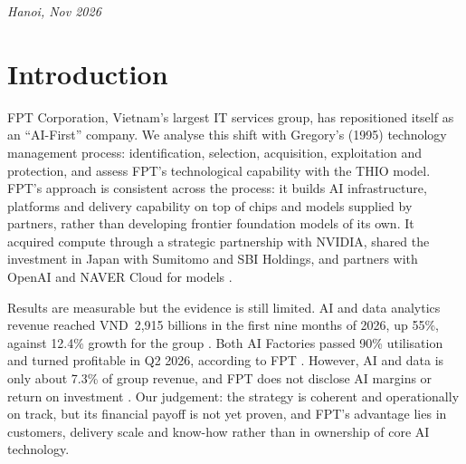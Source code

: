 \documentclass[a4paper,12pt]{report}
\begin{document}
\vfill
\begin{center}
    \textit{Hanoi, Nov 2026}
\end{center}
\newpage


\setcounter{tocdepth}{0}
\tableofcontents
\clearpage
{}
\setcounter{tocdepth}{1}
\listoftables

\clearpage
{}
\setcounter{tocdepth}{1}
\listoffigures

\providecommand{\pending}[1]{\textbf{[#1]}}


\chapter{Introduction}

FPT Corporation, Vietnam's largest IT services group, has repositioned itself as an ``AI-First'' company. 
We analyse this shift with Gregory's (1995) technology management process: identification, selection, acquisition, 
exploitation and protection, and assess FPT's technological capability with the THIO model. FPT's approach is consistent 
across the process: it builds AI infrastructure, platforms and delivery capability on top of chips and models supplied by 
partners, rather than developing frontier foundation models of its own. It acquired compute through a strategic partnership 
with NVIDIA, shared the investment in Japan with Sumitomo and SBI Holdings, and partners with OpenAI and NAVER Cloud for models 
\cite{S5,S6,S8,S9}.

Results are measurable but the evidence is still limited. AI and data analytics revenue reached VND~2,915 billions in the first nine months of 2026, up 55\%, 
against 12.4\% growth for the group \cite{S2}. Both AI Factories passed 90\% utilisation and turned profitable in Q2 2026, 
according to FPT \cite{S4}. However, AI and data is only about 7.3\% of group revenue, and FPT does not disclose AI margins or 
return on investment \cite{S2}. Our judgement: the strategy is coherent and operationally on track, but its financial payoff is 
not yet proven, and FPT's advantage lies in customers, delivery scale and know-how rather than in ownership of core AI technology.
\end{document}
